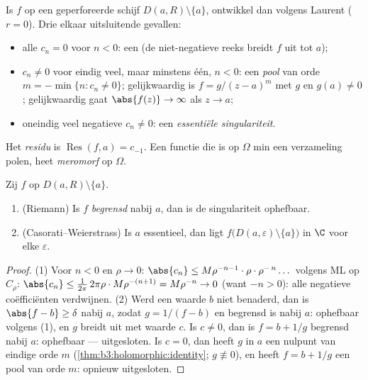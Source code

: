 \begin{definition}\label{def:b3:residues:singularities}
Is $f$  op een geperforeerde schijf $D(a, R)\setminus
\{a\}$, ontwikkel dan volgens Laurent ($r = 0$). Drie elkaar
uitsluitende gevallen:
\begin{itemize}
  \item alle $c_n = 0$ voor $n < 0$: een \emph{} (de niet-negatieve reeks breidt $f$
         uit tot $a$);
  \item $c_n \neq 0$ voor eindig veel, maar minstens één, $n <
        0$: een \emph{pool} van orde $m = -\min\{n : c_n \neq
        0\}$; gelijkwaardig is $f = g/(z-a)^m$ met $g$ 
        en $g(a) \neq 0$; gelijkwaardig gaat $\abs{f(z)} \to
        \infty$ als $z\to a$;
  \item oneindig veel negatieve $c_n \neq 0$: een
        \emph{essentiële singulariteit}.
\end{itemize}
Het \emph{residu} is $\operatorname{Res}(f, a) =
c_{-1}$. Een functie die  is op $\Omega$ min een
verzameling polen, heet \emph{meromorf}
op $\Omega$.
\end{definition}

\begin{theorem}
\label{thm:b3:residues:riemanncw}
Zij $f$  op $D(a,R)\setminus\{a\}$.
\begin{enumerate}
  \item (Riemann) Is $f$ \emph{begrensd} nabij $a$, dan is de
        singulariteit ophefbaar.
  \item (Casorati--Weierstrass) Is $a$ essentieel, dan ligt
        $f\bigl(D(a,\varepsilon)\setminus\{a\}\bigr)$  in
        $\C$ voor elke $\varepsilon$.
\end{enumerate}
\end{theorem}

\begin{proof}
(1) Voor $n < 0$ en $\rho \to 0$: $\abs{c_n} \leq
M\rho^{-n-1}\cdot\rho\cdot\rho^{-\,n}\dots$ volgens ML op
$C_\rho$: $\abs{c_n} \leq \frac{1}{2\pi}\,2\pi\rho\cdot
M\rho^{-(n+1)} = M\rho^{-n} \to 0$ (want $-n > 0$): alle
negatieve coëfficiënten verdwijnen.
(2) Werd een waarde $b$ niet benaderd, dan is $\abs{f - b} \geq
\delta$ nabij $a$, zodat $g = 1/(f - b)$  en begrensd is
nabij $a$: ophefbaar volgens (1), en $g$ breidt uit met waarde
$c$. Is $c \neq 0$, dan is $f = b + 1/g$ begrensd nabij $a$:
ophefbaar --- uitgesloten. Is $c = 0$, dan heeft $g$ in $a$ een
nulpunt van eindige orde $m$ (\cref{thm:b3:holomorphic:identity};
$g \not\equiv 0$), en heeft $f = b + 1/g$ een pool van orde $m$:
opnieuw uitgesloten.
\end{proof}

